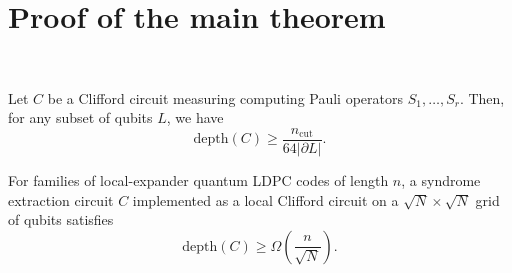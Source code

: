 \section{Proof of the main theorem}

\begin{frame}
  \centering
  \hfill\\
  \begin{theorem}
    Let $C$ be a Clifford circuit measuring computing Pauli operators $S_1, \ldots, S_r$.
    Then, for any subset of qubits $L$, we have
    \begin{equation*}
      \text{depth}(C) 
      \geq
      \frac
        {n_{\text{cut}}}
        {64 |\partial L|}.
    \end{equation*}
  \end{theorem}
  \begin{corollary}
    For families of local-expander quantum LDPC codes of length $n$,
    a syndrome extraction circuit $C$ implemented as a local Clifford circuit 
    on a $\sqrt{N} \times \sqrt{N}$ grid of qubits
    satisfies
    \begin{equation*}
      \text{depth}(C) 
      \geq
      \Omega \left(
        \frac 
          {n}
          {\sqrt{N}}
      \right).
    \end{equation*}
  \end{corollary}
\end{frame}
